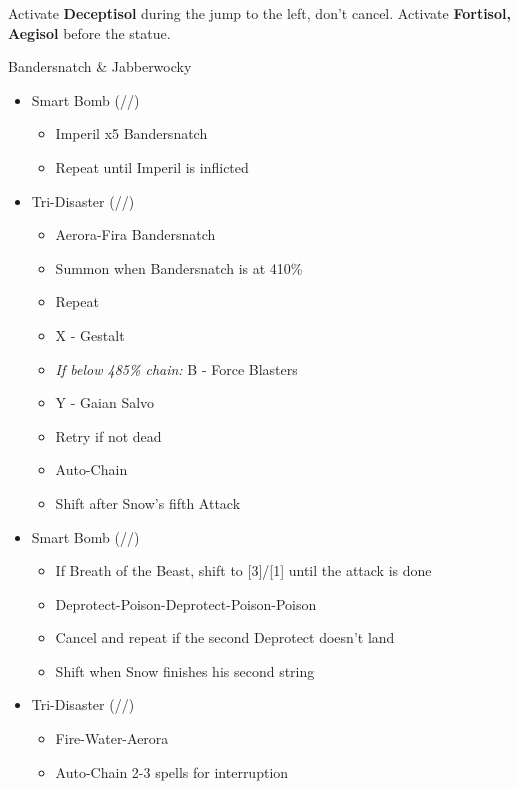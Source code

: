 	Activate \textbf{Deceptisol} during the jump to the left, don't cancel.
	Activate \textbf{Fortisol, Aegisol} before the statue.
	\vfill
	\renewcommand{\second}{[2] Devastation (\sab/\com/\com)}
	\renewcommand{\fifth}{[5] Smart Bomb (\sab/\rav/\rav)}
	\renewcommand{\sixth}{[6] Tri-Disaster (\rav/\rav/\rav)}
	\begin{battle}[0:55]{Bandersnatch \& Jabberwocky}
		\begin{itemize}
			\item \fifth
			      \begin{itemize}
				      \item Imperil x5 Bandersnatch
				      \item Repeat until Imperil is inflicted
			      \end{itemize}
			\item \sixth
			      \begin{itemize}
				      \item Aerora-Fira Bandersnatch
				      \item Summon when Bandersnatch is at 410\%
				      \item Repeat
				      \item X - Gestalt
				      \item {\it If below 485\% chain:} B - Force Blasters
				      \item Y - Gaian Salvo
				      \item Retry if not dead
				      \item Auto-Chain
				      \item Shift after Snow's fifth Attack
			      \end{itemize}
			\item \fifth
			      \begin{itemize}
				      \item If Breath of the Beast, shift to [3]/[1] until the attack is done
				      \item Deprotect-Poison-Deprotect-Poison-Poison
				      \item Cancel and repeat if the second Deprotect doesn't land
				      \item Shift when Snow finishes his second string
			      \end{itemize}
			\item \sixth
			      \begin{itemize}
				      \item Fire-Water-Aerora
				      \item Auto-Chain 2-3 spells for interruption

\end{itemize}
\end{itemize}
\end{battle}
